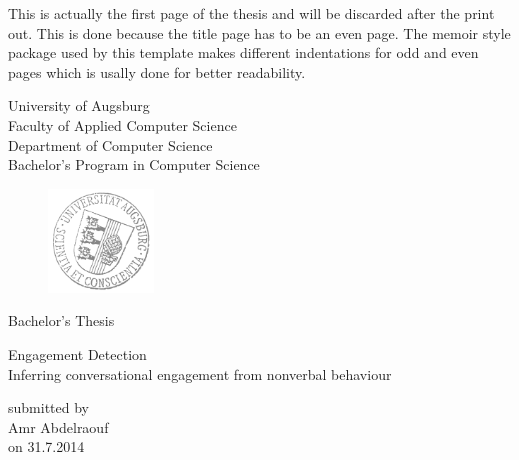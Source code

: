 \documentclass[12pt, a4paper, fleqn]{memoir}%
\begin{document}
\frontmatter

\pagestyle{empty}
This is actually the first page of the thesis and will be discarded after the print out. This is done because 
the title page has to be an even page. The memoir style package used by this template makes different indentations 
for odd and even pages which is usally done for better readability.  
\clearpage

\pagestyle{empty}
\rmfamily
\noindent
\begin{center}
University of Augsburg\\
Faculty of Applied Computer Science\\
Department of Computer Science\\
Bachelor's Program in Computer Science\\
\end{center}
\begin{figure}[h]
\centering
\includegraphics[width=0.25\textwidth]{logo.png}
\end{figure}
\vfill\vfill
\begin{center}
\Large
Bachelor's Thesis\\
\end{center}
\vspace{2.0em}
\begin{center}
\Large
\LARGE Engagement Detection\\ \vspace{10pt} 
\Large Inferring conversational engagement from nonverbal behaviour
\end{center}
\vspace{2.0em}
\begin{center}
    \normalsize
    submitted by\\
    \large
    Amr Abdelraouf\\
    \normalsize
    on 31.7.2014
\end{center}
\end{document}
